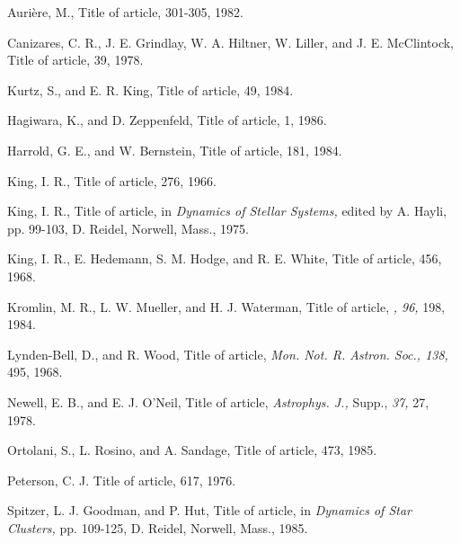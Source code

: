 \begin{references}
Auri\`ere, M., Title of article,  301-305, 1982.

Canizares, C. R., J. E. Grindlay, W. A. Hiltner, W. Liller, and 
    J. E. McClintock, Title of article,  39, 1978.

Kurtz, S., and E. R. King, Title of article,  49, 1984.

Hagiwara, K., and D. Zeppenfeld, Title of article,  1, 1986.

Harrold, G. E., and W. Bernstein, Title of article,  181, 1984.

King, I. R., Title of article,  276, 1966.

King, I. R., Title of article, in {\it Dynamics of Stellar Systems,} edited 
    by A. Hayli, pp. 99-103, D. Reidel, Norwell, Mass., 1975.

King, I. R., E. Hedemann, S. M. Hodge, and R. E. White, Title of article, 
     456, 1968.

Kromlin, M. R., L. W. Mueller, and H. J. Waterman, Title of article, \jatp 
    {\it , 96,} 198, 1984.

Lynden-Bell, D., and R. Wood, Title of article, {\it Mon. Not. R. Astron. 
    Soc., 138,} 495, 1968.

Newell, E. B., and E. J. O'Neil, Title of article, {\it Astrophys. J.,} Supp., 
    {\it 37,} 27, 1978.

Ortolani, S., L. Rosino, and A. Sandage, Title of article,  
    473, 1985.

Peterson, C. J. Title of article,  617, 1976.

Spitzer, L. J. Goodman, and P. Hut, Title of article, in {\it Dynamics of 
    Star Clusters,} pp. 109-125, D. Reidel, Norwell, Mass., 1985.
\end{references}


